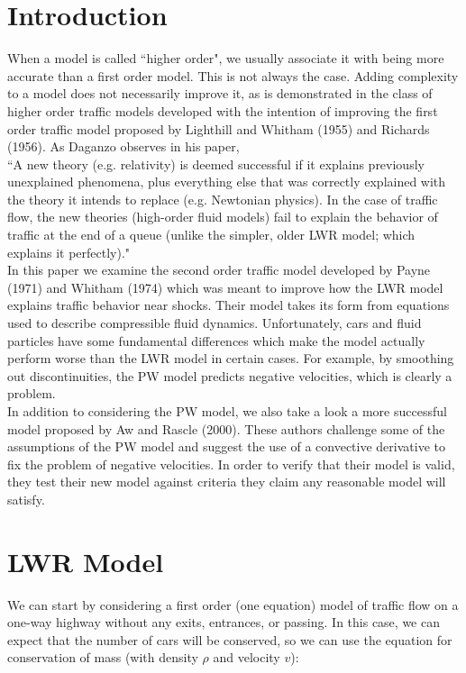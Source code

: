 \documentclass{article}
\begin{document}
\section{Introduction}
When a model is called ``higher order", we usually associate it with being more accurate than a first order model.  This is not always the case.  Adding complexity to a model does not necessarily improve it, as is demonstrated in the class of higher order traffic models developed with the intention of improving the first order traffic model proposed by Lighthill and Whitham (1955) and Richards (1956).  As Daganzo observes in his paper, \\

``A new theory (e.g. relativity) is deemed successful if it explains previously unexplained phenomena, plus everything else that was correctly explained with the theory it intends to replace (e.g. Newtonian physics).  In the case of traffic flow, the new theories (high-order fluid models) fail to explain the behavior of traffic at the end of a queue (unlike the simpler, older LWR model; which explains it perfectly)." \\

In this paper we examine the second order traffic model developed by Payne (1971) and Whitham (1974) which was meant to improve how the LWR model explains traffic behavior near shocks.  Their model takes its form from equations used to describe compressible fluid dynamics.  Unfortunately, cars and fluid particles have some fundamental differences which make the model actually perform worse than the LWR model in certain cases.  For example, by smoothing out discontinuities, the PW model predicts negative velocities, which is clearly a problem.  \\

In addition to considering the PW model, we also take a look a more successful model proposed by Aw and Rascle (2000).  These authors challenge some of the assumptions of the PW model and suggest the use of a convective derivative to fix the problem of negative velocities.  In order to verify that their model is valid, they test their new model against criteria they claim any reasonable model will satisfy.  

\section{LWR Model}
We can start by considering a first order (one equation) model of traffic flow on a one-way highway without any exits, entrances, or passing.  In this case, we can expect that the number of cars will be conserved, so we can use the equation for conservation of mass (with density $\rho$ and velocity $v$):
\end{document}
